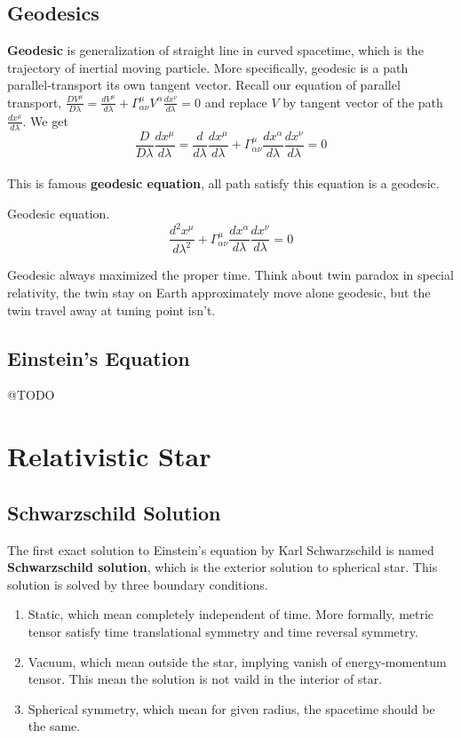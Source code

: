 \documentclass[12pt]{article}
\theoremstyle{mystyle}{\newtheorem{definition}{Definition}[section]}
\theoremstyle{mystyle}{\newtheorem{theorem}[definition]{Theorem}}
\theoremstyle{mystyle}{\newtheorem*{remark}{Remark}}
\theoremstyle{mystyle}{\newtheorem*{example}{Example}}
\theoremstyle{mystyle}{\newtheorem*{examples}{Examples}}
\theoremstyle{cstyle}{\newtheorem*{cthm}{}}
\begin{document}
\subsection{Geodesics}

\textbf{Geodesic} is generalization of straight line in curved spacetime, which is the trajectory of inertial moving particle. 
More specifically, geodesic is a path parallel-transport its own tangent vector. 
Recall our equation of parallel transport, \(\frac{DV^{\mu}}{D\lambda} =
\frac{dV^{\mu}}{d\lambda}+ \Gamma^{\mu}_{\alpha\nu}V^{\alpha}\frac{dx^{\nu}}{d\lambda} = 0\) and replace \(V\) 
by tangent vector of the path \(\frac{dx^{\mu}}{d\lambda}\). We get 
\[\frac{D}{D\lambda}\frac{dx^{\mu}}{d\lambda} =
\frac{d}{d\lambda}\frac{dx^{\mu}}{d\lambda}+ \Gamma^{\mu}_{\alpha\nu}\frac{dx^{\alpha}}{d\lambda}\frac{dx^{\nu}}{d\lambda} = 0\]\\
This is famous \textbf{geodesic equation}, all path satisfy this equation is a geodesic.
\begin{definition}
  Geodesic equation.
  \[\frac{d^2 x^{\mu}}{d\lambda^2}+ \Gamma^{\mu}_{\alpha\nu}\frac{dx^{\alpha}}{d\lambda}\frac{dx^{\nu}}{d\lambda} = 0\]
\end{definition}
Geodesic always maximized the proper time. Think about twin paradox in special relativity, the twin stay on Earth approximately move alone geodesic, 
but the twin travel away at tuning point isn't.

\subsection{Einstein's Equation}
@TODO
\section{Relativistic Star}
\subsection{Schwarzschild Solution}
The first exact solution to Einstein's equation by Karl Schwarzschild is named \textbf{Schwarzschild solution}, 
which is the exterior solution to spherical star.
This solution is solved by three boundary conditions.
\begin{enumerate}
  \item Static, which mean completely independent of time. More formally, metric tensor satisfy time translational symmetry and time reversal symmetry.
  \item Vacuum, which mean outside the star, implying vanish of energy-momentum tensor. This mean the solution is not vaild in the interior of star.
  \item Spherical symmetry, which mean for given radius, the spacetime should be the same.
\end{enumerate}
\end{document}
